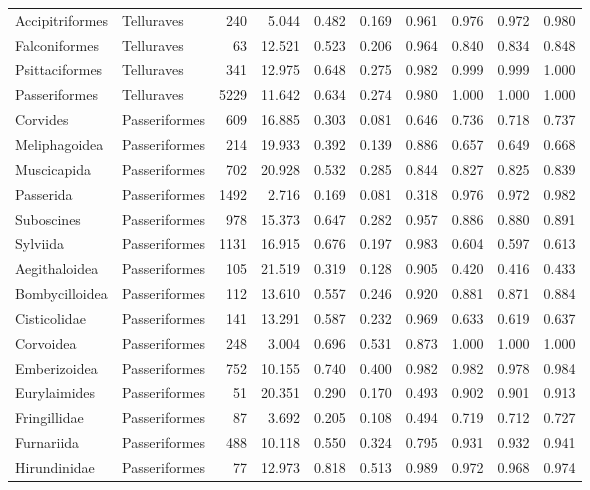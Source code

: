 \begin{table}[ht]
\begin{tabular}{llrrrrrrrr}
  Accipitriformes & Telluraves &  240 & 5.044 & 0.482 & 0.169 & 0.961 & 0.976 & 0.972 & 0.980 \\ 
  Falconiformes & Telluraves &   63 & 12.521 & 0.523 & 0.206 & 0.964 & 0.840 & 0.834 & 0.848 \\ 
  Psittaciformes & Telluraves &  341 & 12.975 & 0.648 & 0.275 & 0.982 & 0.999 & 0.999 & 1.000 \\ 
  Passeriformes & Telluraves & 5229 & 11.642 & 0.634 & 0.274 & 0.980 & 1.000 & 1.000 & 1.000 \\ 
  Corvides & Passeriformes &  609 & 16.885 & 0.303 & 0.081 & 0.646 & 0.736 & 0.718 & 0.737 \\ 
  Meliphagoidea & Passeriformes &  214 & 19.933 & 0.392 & 0.139 & 0.886 & 0.657 & 0.649 & 0.668 \\ 
  Muscicapida & Passeriformes &  702 & 20.928 & 0.532 & 0.285 & 0.844 & 0.827 & 0.825 & 0.839 \\ 
  Passerida & Passeriformes & 1492 & 2.716 & 0.169 & 0.081 & 0.318 & 0.976 & 0.972 & 0.982 \\ 
  Suboscines & Passeriformes &  978 & 15.373 & 0.647 & 0.282 & 0.957 & 0.886 & 0.880 & 0.891 \\ 
  Sylviida & Passeriformes & 1131 & 16.915 & 0.676 & 0.197 & 0.983 & 0.604 & 0.597 & 0.613 \\ 
  Aegithaloidea & Passeriformes &  105 & 21.519 & 0.319 & 0.128 & 0.905 & 0.420 & 0.416 & 0.433 \\ 
  Bombycilloidea & Passeriformes &  112 & 13.610 & 0.557 & 0.246 & 0.920 & 0.881 & 0.871 & 0.884 \\ 
  Cisticolidae & Passeriformes &  141 & 13.291 & 0.587 & 0.232 & 0.969 & 0.633 & 0.619 & 0.637 \\ 
  Corvoidea & Passeriformes &  248 & 3.004 & 0.696 & 0.531 & 0.873 & 1.000 & 1.000 & 1.000 \\ 
  Emberizoidea & Passeriformes &  752 & 10.155 & 0.740 & 0.400 & 0.982 & 0.982 & 0.978 & 0.984 \\ 
  Eurylaimides & Passeriformes &   51 & 20.351 & 0.290 & 0.170 & 0.493 & 0.902 & 0.901 & 0.913 \\ 
  Fringillidae & Passeriformes &   87 & 3.692 & 0.205 & 0.108 & 0.494 & 0.719 & 0.712 & 0.727 \\ 
  Furnariida & Passeriformes &  488 & 10.118 & 0.550 & 0.324 & 0.795 & 0.931 & 0.932 & 0.941 \\ 
  Hirundinidae & Passeriformes &   77 & 12.973 & 0.818 & 0.513 & 0.989 & 0.972 & 0.968 & 0.974 \\ 

\end{tabular}
\end{table}
